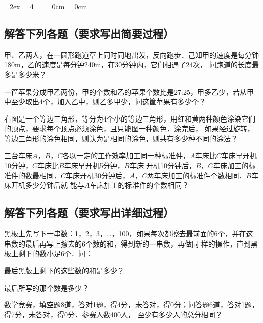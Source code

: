 \documentclass[a4paper]{ctexart}
\newcounter{liti}
\newenvironment{xt}{\begin{list}{\arabic{liti}.}{\usecounter{liti}%
        \labelsep=2ex
        \itemindent = 4\ccwd
        \listparindent = \parindent
        \leftmargin = 0cm
        \rightmargin = 0cm
        \itemsep=2cm
    }}{\end{list}}
\begin{document}
\begin{xt}
    \subsection{解答下列各题（要求写出简要过程）}
        \vspace{-2cm}
        \item 甲、乙两人，在一圆形跑道草上同时同地出发，反向跑步．己知甲的速度是每分钟180m，乙的速度是每分钟240m，在30分钟内，它们相遇了24次，
        问跑道的长度最多是多少米？\vspace{5cm}
        \item 一筐苹果分成甲乙两份，甲的个数和乙的苹果个数比是27:25，甲多乙少，若从甲中至少取出4个，加入乙中，则乙多甲少，问这筐苹果有多少个？
        \vspace{5cm}
        \item 右图是一个等边三角形，等分为4个小的等边三角形，用红和黄两种颜色涂染它们的顶点，要求每个顶点必须涂色，且只能图一种颜色．涂完后，
        如果经过旋转，等边三角形的涂色相同，则认为是相同的涂色，则共有多少种不同的涂法？
        \begin{flushright}
        \end{flushright}
        \item 三台车床$A$，$B$，$C$各以一定的工作效率加工同一种标准件，$A$车床比$C$车床早开机10分钟，$C$车床比$B$车床早开机5分钟，$B$车床
        开机10分钟后，$B$，$C$车床加工的标准件的数最相同．$C$车床开机30分钟后，$A$，$C$两车床加工的标准件个数相同．$B$车床开机多少分钟后就
        能与$A$车床加工的标准件的个数相同？\vspace{3cm}
    \subsection{解答下列各题（要求写出详细过程）}
    \vspace{-2cm}
        \item 黑板上先写下一串数：1，2，3，…，100，如果每次都擦去最前面的6个，并在这串数的最后再写上擦去的6个数的和，得到新的一串数，再做同
        样的操作，直到黑板上剩下的数小足6个．问：
        \begin{asparaenum}[(1)]
            \item 最后黑版上剩下的这些数的和是多少？
            \item 最后所写的那个数是多少？
        \end{asparaenum}
        \vspace{10cm}
        \item 数学竞赛，填空题8道，答对1题，得4分，未答对，得0分；问答题6道，答对1题，得7分，未答对，得0分．参赛人数400人，
        至少有多少人的总分相同？
    \end{xt}
\end{document}
